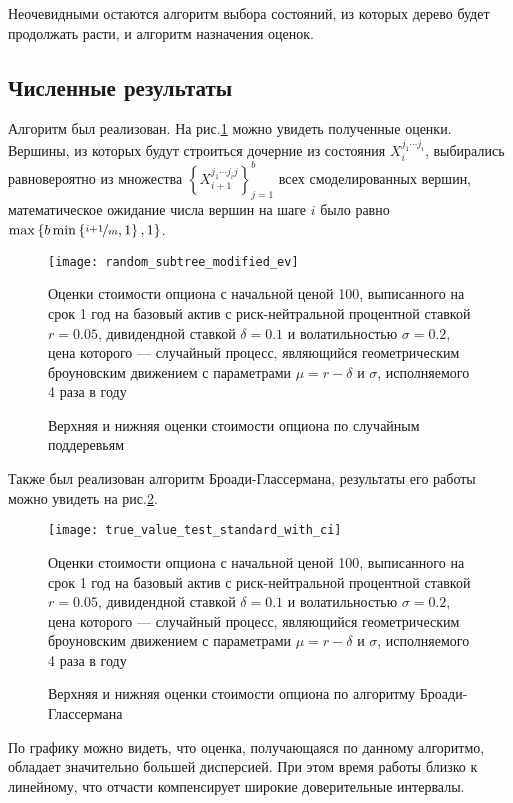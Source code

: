 Неочевидными остаются алгоритм выбора состояний, из которых дерево будет продолжать расти, и алгоритм назначения оценок.
\subsection{Численные результаты}
Алгоритм был реализован. На рис.\ref{fig:random_subtree_modified_ev} можно увидеть полученные оценки. Вершины, из которых будут строиться дочерние из состояния $X_i^{j_1\cdots j_i}$, выбирались равновероятно из множества $\left\lbrace X_{i+1}^{j_1\cdots j_i j}\right\rbrace_{j=1}^b$ всех смоделированных вершин, математическое ожидание числа вершин на шаге $i$ было равно $\max\left\lbrace b\min\left\lbrace\nicefrac{i+1}{m}, 1\right\rbrace, 1\right\rbrace$.
\begin{figure}[h]
    \centering
    \texttt{[image: random\_subtree\_modified\_ev]}
    \caption{Верхняя и нижняя оценки стоимости опциона по случайным поддеревьям}
    \label{fig:random_subtree_modified_ev}
    \footnotesize{Оценки стоимости опциона с начальной ценой 100, выписанного на срок 1 год на базовый актив с риск-нейтральной процентной ставкой $r = 0.05$, дивидендной ставкой $\delta = 0.1$ и волатильностью $\sigma=0.2$, цена которого --- случайный процесс, являющийся геометрическим броуновским движением с параметрами $\mu = r - \delta$ и $\sigma$, исполняемого 4 раза в году}
\end{figure}

Также был реализован алгоритм Броади-Глассермана, результаты его работы можно увидеть на рис.\ref{fig:true_value_test_standard}.
\begin{figure}[h]
    \centering
	\texttt{[image: true\_value\_test\_standard\_with\_ci]}
	\caption{Верхняя и нижняя оценки стоимости опциона по алгоритму Броади-Глассермана}
	\label{fig:true_value_test_standard}
	\footnotesize{Оценки стоимости опциона с начальной ценой 100, выписанного на срок 1 год на базовый актив с риск-нейтральной процентной ставкой $r = 0.05$, дивидендной ставкой $\delta = 0.1$ и волатильностью $\sigma=0.2$, цена которого --- случайный процесс, являющийся геометрическим броуновским движением с параметрами $\mu = r - \delta$ и $\sigma$, исполняемого 4 раза в году}
\end{figure}

По графику можно видеть, что оценка, получающаяся по данному алгоритмо, обладает значительно большей дисперсией. При этом время работы близко к линейному, что отчасти компенсирует широкие доверительные интервалы.